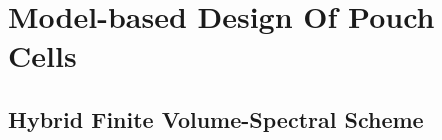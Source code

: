 
\graphicspath{{3/figures/}}

\chapter{Model-based Design Of Pouch Cells}\label{ch:modelbaseddesign}
\section{Hybrid Finite Volume-Spectral Scheme}\label{sec:hybrid fv-spectral}


